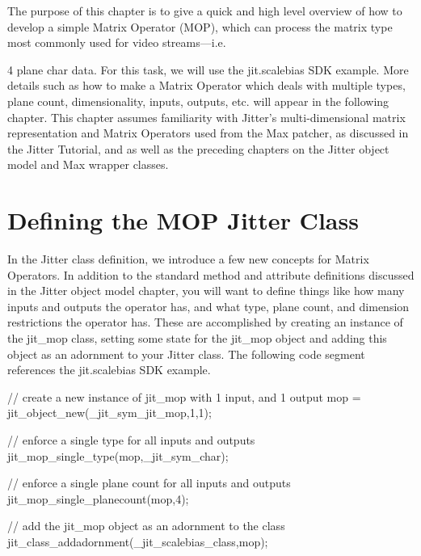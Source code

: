 The purpose of this chapter is to give a quick and high level overview of how to develop a simple Matrix Operator (MOP), which can process the matrix type most commonly used for video streams—i.e.

4 plane char data. For this task, we will use the jit.scalebias SDK example. More details such as how to make a Matrix Operator which deals with multiple types, plane count, dimensionality, inputs, outputs, etc. will appear in the following chapter. This chapter assumes familiarity with Jitter's multi-\/dimensional matrix representation and Matrix Operators used from the Max patcher, as discussed in the Jitter Tutorial, and as well as the preceding chapters on the Jitter object model and Max wrapper classes.\hypertarget{chapter_jit_mopqs_chapter_jit_mopqs_classes}{}\section{Defining the MOP Jitter Class}\label{chapter_jit_mopqs_chapter_jit_mopqs_classes}
In the Jitter class definition, we introduce a few new concepts for Matrix Operators. In addition to the standard method and attribute definitions discussed in the Jitter object model chapter, you will want to define things like how many inputs and outputs the operator has, and what type, plane count, and dimension restrictions the operator has. These are accomplished by creating an instance of the jit\_\-mop class, setting some state for the jit\_\-mop object and adding this object as an adornment to your Jitter class. The following code segment references the jit.scalebias SDK example.


\begin{DoxyCode}
   // create a new instance of jit_mop with 1 input, and 1 output 
   mop = jit_object_new(_jit_sym_jit_mop,1,1);
   
   // enforce a single type for all inputs and outputs
   jit_mop_single_type(mop,_jit_sym_char);   

   // enforce a single plane count for all inputs and outputs
   jit_mop_single_planecount(mop,4);   

   // add the jit_mop object as an adornment to the class
   jit_class_addadornment(_jit_scalebias_class,mop);
\end{DoxyCode}


